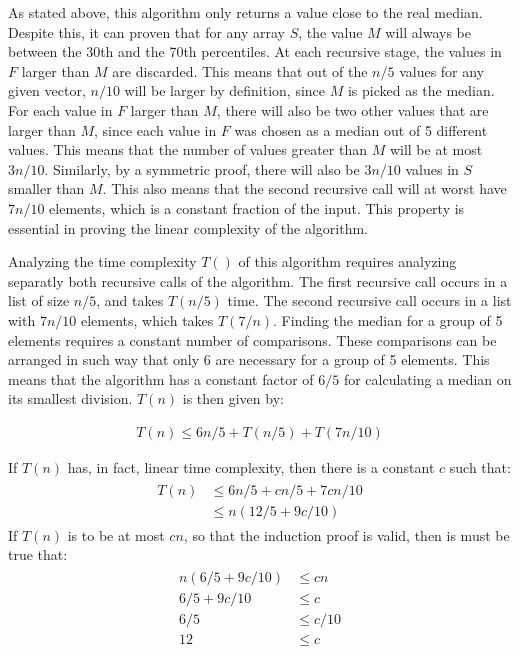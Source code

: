 As stated above, this algorithm only returns a value close to the real median. Despite this, it can proven that for any array $S$, the value $M$ will always be between the 30th and the 70th percentiles. At each recursive stage, the values in $F$ larger than $M$ are discarded. This means that out of the $n/5$ values for any given vector, $n/10$ will be larger by definition, since $M$ is picked as the median. For each value in $F$ larger than $M$, there will also be two other values that are larger than $M$, since each value in $F$ was chosen as a median out of 5 different values. This means that the number of values greater than $M$ will be at most $3n/10$. Similarly, by a symmetric proof, there will also be $3n/10$ values in $S$ smaller than $M$. This also means that the second recursive call will at worst have $7n/10$ elements, which is a constant fraction of the input. This property is essential in proving the linear complexity of the algorithm.

Analyzing the time complexity $T()$ of this algorithm requires analyzing separatly both recursive calls of the algorithm. The first recursive call occurs in a list of size $n/5$, and takes $T(n/5)$ time. The second recursive call occurs in a list with $7n/10$ elements, which takes $T(7/n)$. Finding the median for a group of 5 elements requires a constant number of comparisons. These comparisons can be arranged in such way that only 6 are necessary for a group of 5 elements. This means that the algorithm has a constant factor of $6/5$ for calculating a median on its smallest division. $T(n)$ is then given by:

\begin{align}
T(n) \le 6n/5 + T(n/5) + T(7n/10)
\end{align}

If $T(n)$ has, in fact, linear time complexity, then there is a constant $c$ such that:
\begin{align}
\begin{aligned}
T(n) & \le 6n/5 + cn/5 + 7cn/10\\
     & \le n(12/5 + 9c/10)
\end{aligned}
\end{align}
If $T(n)$ is to be at most $cn$, so that the induction proof is valid, then is must be true that:
\begin{align}
\begin{aligned}
    n (6/5 + 9c/10) & \le cn \\
        6/5 + 9c/10 & \le c \\
                6/5 & \le c/10 \\
                 12 & \le c \\
\end{aligned}
\end{align}

